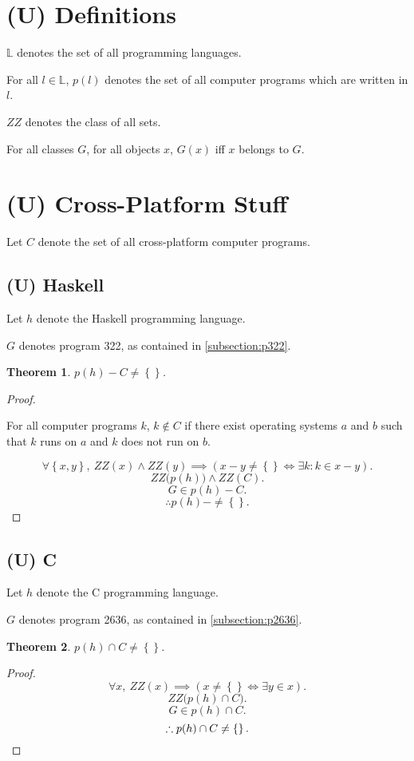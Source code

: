 \documentclass{article}
\newtheorem{thm}{Theorem}
\begin{document}
	\section{(U) Definitions}
		$\mathbb L$ denotes the set of all programming languages.

		For all $l \in \mathbb L$, $p(l)$ denotes the set of all computer
		programs which are written in $l$.

		$\mathit{ZZ}$ denotes the class of all sets.

		For all classes $G$, for all objects $x$, $G(x)$ iff $x$ belongs to
		$G$.
	\section{(U) Cross-Platform Stuff}
			Let $C$ denote the set of all cross-platform computer programs.
		\subsection{(U) Haskell}
			Let $h$ denote the Haskell programming language.

			$G$ denotes program 322, as contained in \cref{subsection:p322}.
			\begin{thm}
				$p(h) - C \neq \left\{\right\}$.
			\end{thm}
			\begin{proof}
				${}$

				For all computer programs $k$, $k \notin C$ if there exist
				operating systems $a$ and $b$ such that $k$ runs on $a$ and
				$k$ does not run on $b$.

				\[
					\forall \left\{x,y\right\},\ 
					\mathit{ZZ}(x) \land \mathit{ZZ}(y)\implies 
					\left(x - y \neq \left\{\right\} \iff
					\exists k : k \in x - y\right).
				\]
				\[
					\mathit{ZZ}\big(p(h)\big) \land \mathit{ZZ}(C).
				\]
				\[
					G \in p(h) - C.
				\]
				\[
					\therefore p(h) -  \neq \left\{\right\}.
				\]
			\end{proof}
		\subsection{(U) C}
			Let $h$ denote the C programming language.

			$G$ denotes program 2636, as contained in \cref{subsection:p2636}.
			\begin{thm}
				$p(h) \cap C \neq \left\{\right\}$.
			\end{thm}
			\begin{proof}
				\[
					\forall x,\ 
					\mathit{ZZ}(x) \implies 
					\left(x \neq \left\{\right\} \iff \exists y \in x\right).
				\]
				\[
					\mathit{ZZ}\big(p(h) \cap C\big).
				\]
				\[
					G \in p(h) \cap C.
				\]
				\[
					\therefore p(h) \cap C \neq \left\{\right\}.\qedhere
				\]
			\end{proof}
\end{document}
